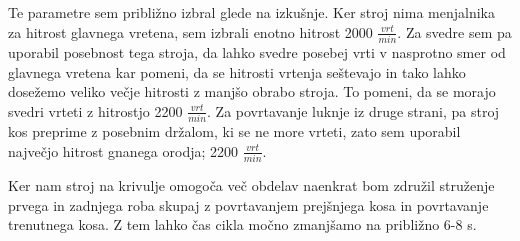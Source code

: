 Te parametre sem približno izbral glede na izkušnje. Ker stroj nima 
menjalnika za hitrost glavnega vretena, sem izbrali enotno hitrost 
2000 \( \frac{vrt}{min} \). Za svedre sem pa uporabil posebnost tega stroja,
da lahko svedre posebej vrti v nasprotno smer od glavnega vretena kar pomeni,
da se hitrosti vrtenja seštevajo in tako lahko dosežemo veliko večje hitrosti 
z manjšo obrabo stroja. To pomeni, da se morajo svedri vrteti z hitrostjo
2200 \( \frac{vrt}{min} \). Za povrtavanje luknje iz druge strani, pa stroj 
kos preprime z posebnim držalom, ki se ne more vrteti, zato sem uporabil največjo
hitrost gnanega orodja; 2200 \( \frac{vrt}{min} \).

Ker nam stroj na krivulje omogoča več obdelav naenkrat bom združil 
struženje prvega in zadnjega roba skupaj z povrtavanjem prejšnjega 
kosa in povrtavanje trenutnega kosa. Z tem lahko čas cikla močno 
zmanjšamo na približno 6-8 s.

\newpage